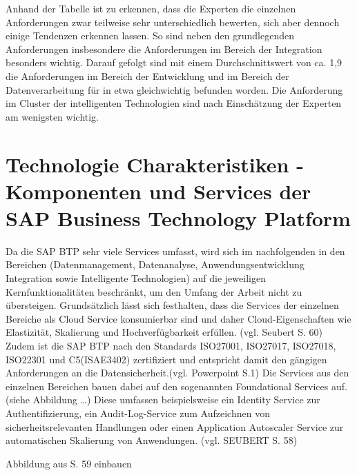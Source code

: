 Anhand der Tabelle ist zu erkennen, dass die Experten die einzelnen Anforderungen zwar teilweise sehr unterschiedlich bewerten, sich aber dennoch einige Tendenzen erkennen lassen. So sind neben den grundlegenden Anforderungen insbesondere die Anforderungen im Bereich der Integration besonders wichtig. Darauf gefolgt sind mit einem Durchschnittswert von ca. 1,9 die Anforderungen im Bereich der Entwicklung und im Bereich der Datenverarbeitung für in etwa gleichwichtig befunden worden. Die Anforderung im Cluster der intelligenten Technologien sind nach Einschätzung der Experten am wenigsten wichtig.















\section{Technologie Charakteristiken - Komponenten und Services der SAP Business Technology Platform}\label{sec:TechCharak}

Da die SAP BTP sehr viele Services umfasst, wird sich im nachfolgenden in den Bereichen (Datenmanagement, Datenanalyse, Anwendungsentwicklung Integration sowie Intelligente Technologien) auf die jeweiligen Kernfunktionalitäten beschränkt, um den Umfang der Arbeit nicht zu übersteigen. Grundsätzlich lässt sich festhalten, dass die Services der einzelnen Bereiche als Cloud Service konsumierbar sind und daher Cloud-Eigenschaften wie Elastizität, Skalierung und Hochverfügbarkeit erfüllen. (vgl. Seubert S. 60) Zudem ist die SAP BTP nach den Standards ISO27001, ISO27017, ISO27018, ISO22301 und C5(ISAE3402) zertifiziert und entspricht damit den gängigen Anforderungen an die Datensicherheit.(vgl. Powerpoint S.1) Die Services aus den einzelnen Bereichen bauen dabei auf den sogenannten Foundational Services auf.(siehe Abbildung …) Diese umfassen beispielsweise ein Identity Service zur Authentifizierung, ein Audit-Log-Service zum Aufzeichnen von sicherheitsrelevanten Handlungen oder einen Application Autoscaler Service zur automatischen Skalierung von Anwendungen. (vgl. SEUBERT S. 58)

Abbildung aus S. 59 einbauen

